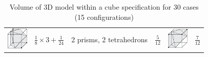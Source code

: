 \documentclass[11pt]{article}
\begin{document}
\begin{table}[]
\begin{tabular}{c|c|c|c|c|c}
        \includegraphics[width=1cm]{Figures/case 15.png} & $\frac{1}{8} \times 3 + \frac{1}{24}$ &2 prisms, 2 tetrahedrons& $\frac{5}{12}$ & \includegraphics[width=1cm]{Figures/case 30.png} & $\frac{7}{12}$ \\
        
    \end{tabular}
    \caption{Volume of 3D model within a cube specification for 30 cases (15 configurations)}
    \label{tab:volume configurations}
\end{table}
\end{document}
